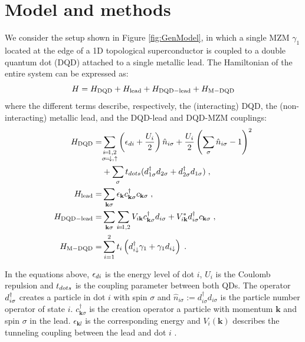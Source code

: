 \documentclass[showpacs,aps,prb,reprint,superscriptaddress]{revtex4-1}
\begin{document}
\section{Model and methods}
\label{sec:modelmethods}


We consider the setup shown in Figure \ref{fig:GenModel}, in which a single MZM $\gamma_1$ located at the edge of a 1D topological superconductor is coupled to a double quantum dot (DQD) attached to a single metallic lead. The Hamiltonian of the entire system can be expressed as:
%
\begin{equation}
H=H_{\rm DQD}+H_{\rm lead}+H_{\rm DQD-lead}+H_{\rm M-DQD} 
\label{eq:Model}
\end{equation}
%
where the different terms describe, respectively, the (interacting) DQD, the (non-interacting) metallic lead, and the DQD-lead and DQD-MZM couplings:
\begin{align}
    H_{\rm DQD} =& \!  \sum_{\substack{i\!=\! 1,2 \\ \sigma \!=\! \dw , \up }} \left(\epsilon_{di}+\frac{U_i}{2}\right)\hat{n}_{i\sigma} + \frac{U_i}{2}\left(\sum_{\sigma} \hat{n}_{i\sigma}-1\right)^{2} \nonumber \\ 
& + \sum_{\sigma} \tdots(\dann_{1\sigma}  d_{2\sigma}+\dann_{2\sigma}  d_{1\sigma}) \; ,   \nonumber  \\ 
H_{\rm lead} =&  \sum_{\mathbf{k}\sigma }\epsilon_{\mathbf{k}}c_{\mathbf{k}\sigma}^{\dagger}c_{\mathbf{k}\sigma }  \; ,   \nonumber \\ 
H_{\rm DQD-lead} =&  \sum_{\mathbf{k}\sigma }\sum_{i\!=\!1,2 }V_{i\textbf{k}} c_{\mathbf{k}\sigma }^{\dagger}d_{i\sigma}+V^*_{i\textbf{k}} d_{i\sigma}^{\dagger}c_{\mathbf{k}\sigma } \; ,  \nonumber  \\ 
H_{\rm M-DQD} =&  \sum_{i=1}^2t_{i} \left(d_{i\downarrow}^{\dagger}\gamma_{1}+\gamma_{1}d_{i\downarrow}\right) \; .
%
\label{eq:H_DQD} 
\end{align}


%
In the equations above, $\epsilon_{di}$ is the energy level of dot $i$, $U_i$ is the Coulomb repulsion and $t_{dots}$ is the coupling parameter between both QDs. The operator $d^{\dagger}_{i\sigma}$ creates a particle in dot $i$ with spin $\sigma$ and $\hat{n}_{i\sigma}:=d_{i\sigma}^{\dagger}d_{i\sigma}$ is the particle number operator of state $i$.  $c_{\mathbf{k}\sigma }^{\dagger}$ is the creation operator a particle with momentum $\mathbf{k}$ and spin
$\sigma$ in the lead.  $\epsilon_{\mathbf{k}l}$ is the corresponding energy
 and $V_i(\textbf{k})$ describes the tunneling coupling between the lead and dot $i$ . \\
\end{document}
